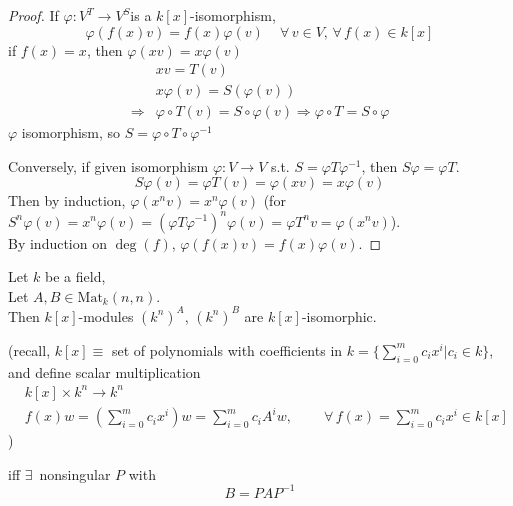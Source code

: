 \begin{proof}
	If $\varphi:V^T \to V^S$is a $k[x]$-isomorphism, 
	\[
	\varphi(f(x)v) = f(x)\varphi(v) \quad \, \forall \, v \in V , \, \forall \, f(x) \in k[x]
	\]
	if $f(x)=x$, then $\varphi(xv) = x\varphi(v)$
	\[
	\begin{aligned}
	& xv = T(v) \\ 
	& x\varphi(v) = S(\varphi(v)) \\ 
	\Longrightarrow & \varphi \circ T(v) = S \circ \varphi(v) \Longrightarrow \varphi \circ T = S \circ \varphi 
	\end{aligned}
	\]
	$\varphi$ isomorphism, so $S = \varphi \circ T \circ \varphi^{-1}$
	
	Conversely, if given isomorphism $\varphi: V \to V$ s.t. $S = \varphi T \varphi^{-1}$, then $S\varphi = \varphi T$.  
	\[
	S\varphi(v) = \varphi T(v) = \varphi(xv) = x\varphi(v)
	\]
	Then by induction, $\varphi(x^nv) = x^n\varphi(v)$ (for $S^n\varphi(v) = x^n\varphi(v) = (\varphi T \varphi^{-1})^n \varphi(v) = \varphi T^n v = \varphi(x^nv)$).  \\
	By induction on $\deg{(f)}$, $\varphi(f(x)v) = f(x)\varphi(v)$.  
	
	
\end{proof}



\begin{corollary} 
	Let $k$ be a field, \\
	Let $A,B \in \text{Mat}_k(n,n)$.  \\
	Then $k[x]$-modules $(k^n)^A$, $(k^n)^B$ are $k[x]$-isomorphic.  
	
	(recall, $k[x]\equiv $ set of polynomials with coefficients in $k = \lbrace \sum_{i=0}^m c_ix^i | c_i \in k \rbrace$, and define scalar multiplication 
	\[
	\begin{aligned}
		& k[x] \times k^n \to k^n \\
		& f(x) w = \left( \sum_{i=0}^m c_i x^i \right) w = \sum_{i=0}^m c_iA^i w, \qquad \  \forall \, f(x) = \sum_{i=0}^m c_i x^i \in k[x] 
	\end{aligned}
	\]
	)
	
	iff $\exists \, $ nonsingular $P$ with 
	\[
	B=PAP^{-1}
	\]
	
	\end{corollary}

